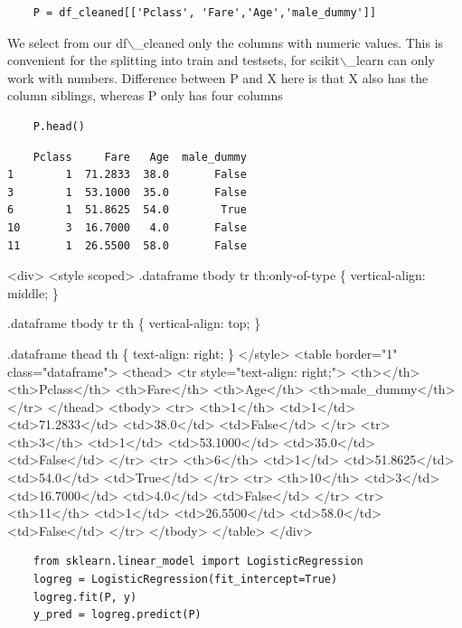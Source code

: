\documentclass[11pt]{article}
\begin{document}
\begin{verbatim}
    P = df_cleaned[['Pclass', 'Fare','Age','male_dummy']]
\end{verbatim}

We select from our df$\backslash$\_cleaned only the columns with numeric values.
This is convenient for the splitting into train and testsets, for
scikit$\backslash$\_learn can only work with numbers. Difference between P and X
here is that X also has the column siblings, whereas P only has four
columns

\begin{verbatim}
    P.head()
\end{verbatim}

\begin{verbatim}
    Pclass     Fare   Age  male_dummy
1        1  71.2833  38.0       False
3        1  53.1000  35.0       False
6        1  51.8625  54.0        True
10       3  16.7000   4.0       False
11       1  26.5500  58.0       False
\end{verbatim}

\begin{HTML}
<div>
<style scoped>
    .dataframe tbody tr th:only-of-type \{
	vertical-align: middle;
    \}

.dataframe tbody tr th \{
    vertical-align: top;
\}

    .dataframe thead th \{
	text-align: right;
    \}
</style>
<table border="1" class="dataframe">
  <thead>
    <tr style="text-align: right;">
      <th></th>
      <th>Pclass</th>
      <th>Fare</th>
      <th>Age</th>
      <th>male\_dummy</th>
    </tr>
  </thead>
  <tbody>
    <tr>
      <th>1</th>
      <td>1</td>
      <td>71.2833</td>
      <td>38.0</td>
      <td>False</td>
    </tr>
    <tr>
      <th>3</th>
      <td>1</td>
      <td>53.1000</td>
      <td>35.0</td>
      <td>False</td>
    </tr>
    <tr>
      <th>6</th>
      <td>1</td>
      <td>51.8625</td>
      <td>54.0</td>
      <td>True</td>
    </tr>
    <tr>
      <th>10</th>
      <td>3</td>
      <td>16.7000</td>
      <td>4.0</td>
      <td>False</td>
    </tr>
    <tr>
      <th>11</th>
      <td>1</td>
      <td>26.5500</td>
      <td>58.0</td>
      <td>False</td>
    </tr>
  </tbody>
</table>
</div>
\end{HTML}

\begin{verbatim}
    from sklearn.linear_model import LogisticRegression
    logreg = LogisticRegression(fit_intercept=True)
    logreg.fit(P, y)
    y_pred = logreg.predict(P)
\end{verbatim}
\end{document}

